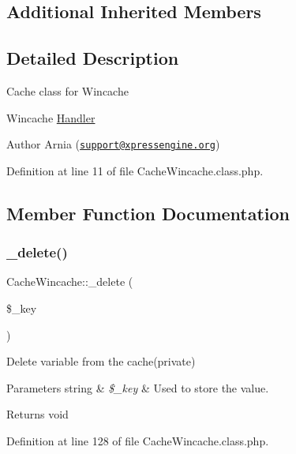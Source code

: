 \subsection*{Additional Inherited Members}


\subsection{Detailed Description}
Cache class for Wincache

Wincache \hyperlink{classHandler}{Handler}

\begin{DoxyAuthor}{Author}
Arnia (\href{mailto:support@xpressengine.org}{\tt support@xpressengine.\+org}) 
\end{DoxyAuthor}


Definition at line 11 of file Cache\+Wincache.\+class.\+php.



\subsection{Member Function Documentation}
\mbox{\label{classCacheWincache_ab20145a0ee5672f182b6da797c80b77a}} 
\subsubsection{\texorpdfstring{\+\_\+delete()}{\_delete()}}
{\footnotesize\ttfamily Cache\+Wincache\+::\+\_\+delete (\begin{DoxyParamCaption}\item[{}]{\$\+\_\+key }\end{DoxyParamCaption})}

Delete variable from the cache(private)


\begin{DoxyParams}[1]{Parameters}
string & {\em \$\+\_\+key} & Used to store the value. \\
\hline
\end{DoxyParams}
\begin{DoxyReturn}{Returns}
void 
\end{DoxyReturn}


Definition at line 128 of file Cache\+Wincache.\+class.\+php.

\mbox{\label{classCacheWincache_a564e8c74dc22b1e84a0d1cfd6d0d935e}} 
